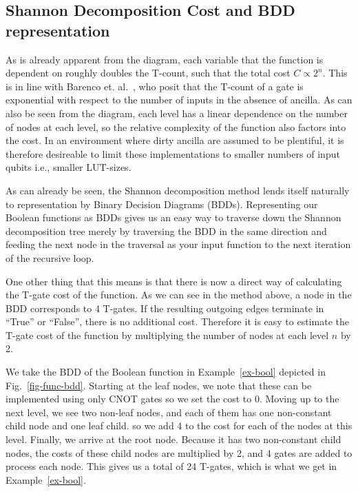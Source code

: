

\subsection{Shannon Decomposition Cost and BDD representation}

As is already apparent from the diagram, each variable that the function is dependent on roughly doubles the T-count, such that the total cost $C \propto 2^n$. This is in line with Barenco et. al.~\cite{bib-barenco-elementary}, who posit that the T-count of a gate is exponential with respect to the number of inputs in the absence of ancilla. As can also be seen from the diagram, each level has a linear dependence on the number of nodes at each level, so the relative complexity of the function also factors into the cost. In an environment where dirty ancilla are assumed to be plentiful, it is therefore desireable to limit these implementations to smaller numbers of input qubits i.e., smaller LUT-sizes.

As can already be seen, the Shannon decomposition method lends itself naturally to representation by Binary Decision Diagrams (BDDs). Representing our Boolean functions as BDDs gives us an easy way to traverse down the Shannon decomposition tree merely by traversing the BDD in the same direction and feeding the next node in the traversal as your input function to the next iteration of the recursive loop.

One other thing that this means is that there is now a direct way of calculating the T-gate cost of the function. As we can see in the method above, a node in the BDD corresponds to 4 T-gates. If the resulting outgoing edges terminate in ``True'' or ``False'', there is no additional cost. Therefore it is easy to estimate the T-gate cost of the function by multiplying the number of nodes at each level $n$ by 2. 

\begin{example}
  \label{ex-cost}
  We take the BDD of the Boolean function in Example~\ref{ex-bool}
  depicted in Fig.~\ref{fig-func-bdd}. Starting at the leaf nodes, we
  note that these can be implemented using only CNOT gates so we set
  the cost to 0. Moving up to the next level, we see two non-leaf
  nodes, and each of them has one non-constant child node and one leaf
  child. so we add 4 to the cost for each of the nodes at this
  level. Finally, we arrive at the root node. Because it has two
  non-constant child nodes, the costs of these child nodes are
  multiplied by 2, and 4 gates are added to process each node. This
  gives us a total of 24 T-gates, which is what we get in
  Example~\ref{ex-bool}. 
\end{example}



